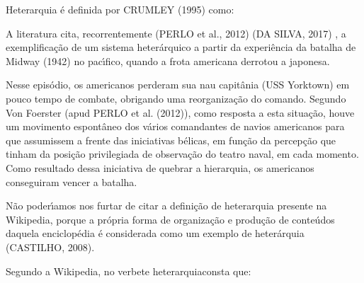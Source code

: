 \documentclass[
12pt,		%
openright,	%
twoside,  %
a4paper,			%
chapter=TITLE,		%
english,			%
french,				%
spanish,			%
brazil				%
]{USPSC-classe/USPSC}
\begin{document}
Heterarquia \'e definida por  CRUMLEY (1995) como:











\noindent\begin{center}\mbox{\centering{}}\end{center}


A literatura cita, recorrentemente  (PERLO et al., 2012) (DA SILVA, 2017) , a exemplifica\c{c}\~ao de um sistema heter\'arquico a partir da experi\^encia da batalha de Midway (1942) no pac\'{\i}fico, quando a frota americana derrotou a japonesa.










Nesse epis\'odio, os americanos perderam sua nau capit\^ania (USS Yorktown) em pouco tempo de combate, obrigando uma reorganiza\c{c}\~ao do comando. Segundo Von Foerster (apud  PERLO et al. (2012)), como resposta a esta situa\c{c}\~ao, houve um movimento espont\^aneo dos v\'arios comandantes de navios americanos para que assumissem a frente das iniciativas b\'elicas, em fun\c{c}\~ao da percep\c{c}\~ao que tinham da posi\c{c}\~ao privilegiada de observa\c{c}\~ao do teatro naval, em cada momento. Como resultado dessa iniciativa de \textquotedbl quebrar a hierarquia\textquotedbl , os americanos conseguiram vencer a batalha.










N\~ao poder\'{\i}amos nos furtar de citar a defini\c{c}\~ao de heterarquia presente na Wikipedia, porque a pr\'opria forma de organiza\c{c}\~ao e produ\c{c}\~ao de conte\'udos daquela enciclop\'edia \'e considerada como um exemplo de heter\'arquia  (CASTILHO, 2008).










Segundo a Wikipedia, no verbete \textquotedbl heterarquia\textquotedbl  consta que:
\end{document}
